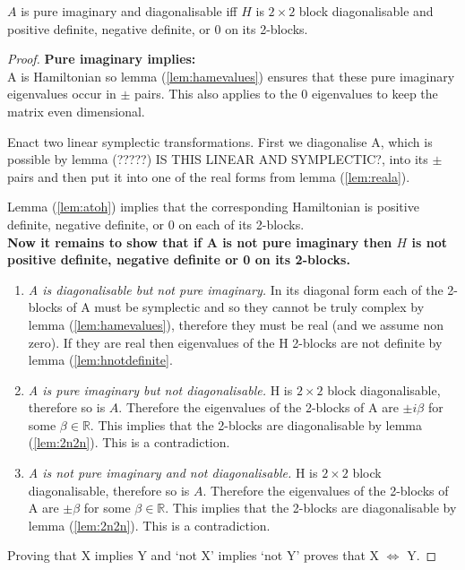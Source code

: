 \begin{theorem}$A$ is pure imaginary and diagonalisable iff $H$ is $2\times2$ block diagonalisable and positive definite, negative definite, or 0 on its 2-blocks.
\end{theorem}
\begin{proof}
\textbf{Pure imaginary implies:} \\
A is Hamiltonian so lemma (\ref{lem:hamevalues}) ensures that these pure imaginary eigenvalues occur in $\pm$ pairs. This also applies to the $0$ eigenvalues to keep the matrix even dimensional.

Enact two linear symplectic transformations. First we diagonalise A, which is possible by lemma (?????) IS THIS LINEAR AND SYMPLECTIC?, into its $\pm$ pairs and then put it into one of the real forms from lemma (\ref{lem:reala}).

Lemma (\ref{lem:atoh}) implies that the corresponding Hamiltonian is positive definite, negative definite, or 0 on each of its 2-blocks.\\

\textbf{Now it remains to show that if A is not pure imaginary then $H$ is not positive definite, negative definite or 0 on its 2-blocks.}

\begin{enumerate}
\item \textit{A is diagonalisable but not pure imaginary.} In its diagonal form each of the 2-blocks of A must be symplectic and so they cannot be truly complex by lemma (\ref{lem:hamevalues}), therefore they must be real (and we assume non zero). If they are real then eigenvalues of the H 2-blocks are not definite by lemma (\ref{lem:hnotdefinite}.
\item \textit{A is pure imaginary but not diagonalisable.} H is $2 \times 2$ block diagonalisable, therefore so is $A$. Therefore the eigenvalues of the 2-blocks of A are $\pm i\beta$ for some $\beta \in \mathbb{R}$. This implies that the 2-blocks are diagonalisable by lemma (\ref{lem:2n2n}). This is a contradiction.
\item \textit{A is not pure imaginary and not diagonalisable.} H is $2 \times 2$ block diagonalisable, therefore so is $A$. Therefore the eigenvalues of the 2-blocks of A are $\pm \beta$ for some $\beta \in \mathbb{R}$. This implies that the 2-blocks are diagonalisable by lemma (\ref{lem:2n2n}). This is a contradiction.
\end{enumerate}

Proving that X implies Y and `not X' implies `not Y' proves that X $\iff$ Y.
\end{proof}

